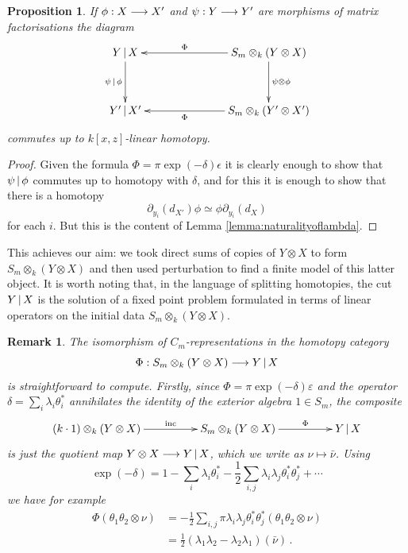 \documentclass[english,letter paper,12pt,leqno]{article}
\newtheorem{proposition}[theorem]{Proposition}
\theoremstyle{example}
\newtheorem{remark}[theorem]{Remark}
\numberwithin{equation}{section}
\def\be{\begin{equation}}
\def\ee{\end{equation}}
\begin{document}
\begin{proposition}\label{prop:naturality_main_thm} If $\phi: X \longrightarrow X'$ and $\psi: Y \longrightarrow Y'$ are morphisms of matrix factorisations the diagram
\begin{equation}\label{eq:final_finite_naturality}
\xymatrix@C+4pc@R+1pc{
Y \l X \ar[d]_-{\psi \l \phi} & S_m \otimes_k ( Y \otimes X )\ar[l]_-{\Phi} \ar[d]^-{\psi \otimes \phi}\\
Y' \l X' & S_m \otimes_k ( Y' \otimes X' )\ar[l]^-{\Phi}
}
\end{equation}
commutes up to $k[x,z]$-linear homotopy.
\end{proposition}
\begin{proof}
Given the formula $\Phi = \pi \exp(-\delta) \epsilon$ it is clearly enough to show that $\psi \,|\, \phi$ commutes up to homotopy with $\delta$, and for this it is enough to show that there is a homotopy
\[
\partial_{y_i}(d_{X'}) \phi \simeq \phi \partial_{y_i}(d_X)
\]
for each $i$. But this is the content of Lemma \ref{lemma:naturalityoflambda}.
\end{proof}

This achieves our aim: we took direct sums of copies of $Y \otimes X$ to form $S_m \otimes_k( Y \otimes X )$ and then used perturbation to find a finite model of this latter object. It is worth noting that, in the language of splitting homotopies, the cut $Y \,|\, X$ is the solution of a fixed point problem formulated in terms of linear operators on the initial data $S_m \otimes_k( Y \otimes X )$. 

\begin{remark} The isomorphism of $C_m$-representations in the homotopy category
\[
\Phi: S_m \otimes_k (Y \otimes X) \longrightarrow Y \,|\, X
\]
is straightforward to compute. Firstly, since $\Phi = \pi \exp(-\delta) \varepsilon$ and the operator $\delta = \sum_i \lambda_i \theta_i^*$ annihilates the identity of the exterior algebra $1 \in S_m$, the composite
\be
\xymatrix@C+2pc{
( k \cdot 1 ) \otimes_k ( Y \otimes X ) \ar[r]^-{\operatorname{inc}} & S_m \otimes_k ( Y \otimes X ) \ar[r]^-{\Phi} & Y \l X
}
\ee
is just the quotient map $Y \otimes X \longrightarrow Y \,|\, X$, which we write as $\nu \mapsto \bar{\nu}$. Using
\[
\exp(-\delta) = 1 - \sum_i \lambda_i \theta_i^* - \frac{1}{2}\sum_{i,j} \lambda_i \lambda_j \theta_i^* \theta_j^* + \cdots
\]
we have for example
\begin{align*}
\Phi( \theta_1 \theta_2 \otimes \nu ) &= - \frac{1}{2} \sum_{i,j} \pi \lambda_i \lambda_j  \theta_i^* \theta_j^*( \theta_1 \theta_2 \otimes \nu )\\
&= \frac{1}{2}\left( \lambda_1 \lambda_2 -\lambda_2 \lambda_1 \right)( \bar{\nu} )\,.
\end{align*}
\end{remark}
\end{document}
